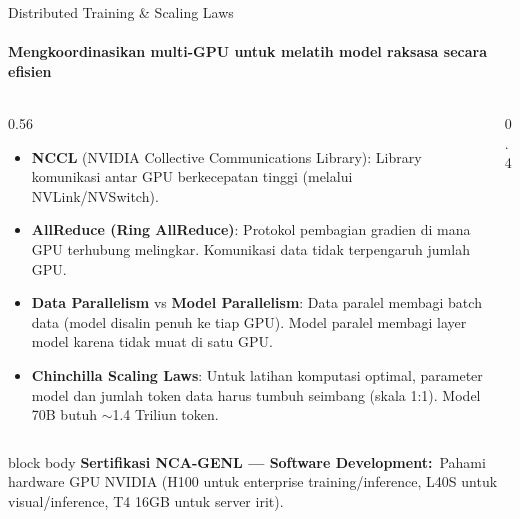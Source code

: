\documentclass[aspectratio=169,t]{beamer}
\newcommand{\certnote}[2]{%
  \vspace{0.1em}
  \begin{beamercolorbox}[rounded=true,shadow=false,sep=4pt]{block body}
    {\scriptsize\color{nvblue}\textbf{Sertifikasi NCA-GENL --- #1:}}\,
    {\scriptsize\color{nvgray}#2}
  \end{beamercolorbox}%
}
\begin{document}
\begin{frame}{Distributed Training \& Scaling Laws}
  \framesubtitle{Mengkoordinasikan multi-GPU untuk melatih model raksasa secara efisien}
  \begin{columns}[T]
    \begin{column}{0.56\textwidth}
      \begin{itemize}\footnotesize
        \item \textbf{NCCL} (NVIDIA Collective Communications Library): Library komunikasi antar GPU berkecepatan tinggi (melalui NVLink/NVSwitch).
        \item \textbf{AllReduce (Ring AllReduce)}: Protokol pembagian gradien di mana GPU terhubung melingkar. Komunikasi data tidak terpengaruh jumlah GPU.
        \item \textbf{Data Parallelism} vs \textbf{Model Parallelism}: Data paralel membagi batch data (model disalin penuh ke tiap GPU). Model paralel membagi layer model karena tidak muat di satu GPU.
        \item \textbf{Chinchilla Scaling Laws}: Untuk latihan komputasi optimal, parameter model dan jumlah token data harus tumbuh seimbang (skala 1:1). Model 70B butuh $\sim$1.4 Triliun token.
      \end{itemize}
    \end{column}
    \begin{column}{0.4\textwidth}
      \begin{center}
      \end{center}
    \end{column}
  \end{columns}
  \certnote{Software Development}{Pahami hardware GPU NVIDIA (H100 untuk enterprise training/inference, L40S untuk visual/inference, T4 16GB untuk server irit).}
\end{frame}
\end{document}
